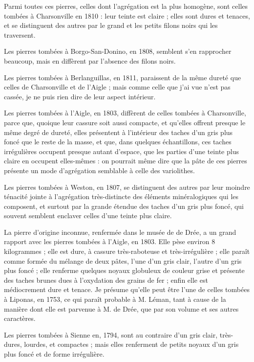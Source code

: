 \documentclass[a4paper, 12pt, oneside, french]{article}
\begin{document}
Parmi toutes ces pierres, celles dont l'agrégation est la plus homogène, sont celles tombées à Charsonville en 1810 : leur teinte est claire ; elles sont dures et tenaces, et se distinguent des autres par le grand et les petits filons noirs qui les traversent.

Les pierres tombées à Borgo-San-Donino, en 1808, semblent s'en rapprocher beaucoup, mais en diffèrent par l'absence des filons noirs.

Les pierres tombées à Berlanguillas, en 1811, paraissent de la même dureté que celles de Charsonville et de l'Aigle ; mais comme celle que j'ai vue n'est pas cassée, je ne puis rien dire de leur aspect intérieur.

Les pierres tombées à l'Aigle, en 1803, diffèrent de celles tombées à Charsonville, parce que, quoique leur cassure soit aussi compacte, et qu'elles offrent presque le même degré de dureté, elles présentent à l'intérieur des taches d'un gris plus foncé que le reste de la masse, et que, dans quelques échantillons, ces taches irrégulières occupent presque autant d'espace, que les parties d'une teinte plus claire en occupent elles-mêmes : on pourrait même dire que la pâte de ces pierres présente un mode d'agrégation semblable à celle des variolithes.

Les pierres tombées à Weston, en 1807, se distinguent des autres par leur moindre ténacité jointe à l'agrégation très-distincte des éléments minéralogiques qui les composent, et surtout par la grande étendue des taches d'un gris plus foncé, qui souvent semblent enclaver celles d'une teinte plus claire.

La pierre d'origine inconnue, renfermée dans le musée de de Drée, a un grand rapport avec les pierres tombées à l'Aigle, en 1803. Elle pèse environ 8 kilogrammes ; elle est dure, à cassure très-raboteuse et très-irrégulière ; elle paraît comme formée du mélange de deux pâtes, l'une d'un gris clair, l'autre d'un gris plus foncé ; elle renferme quelques noyaux globuleux de couleur grise et présente des taches brunes dues à l'oxydation des grains de fer ; enfin elle est médiocrement dure et tenace. Je présume qu'elle peut être l'une de celles tombées à Liponas, en 1753, ce qui paraît probable à M. Léman, tant à cause de la manière dont elle est parvenue à M. de Drée, que par son volume et ses autres caractères.

Les pierres tombées à Sienne en, 1794, sont au contraire d'un gris clair, très-dures, lourdes, et compactes ; mais elles renferment de petits noyaux d'un gris plus foncé et de forme irrégulière.
\end{document}
